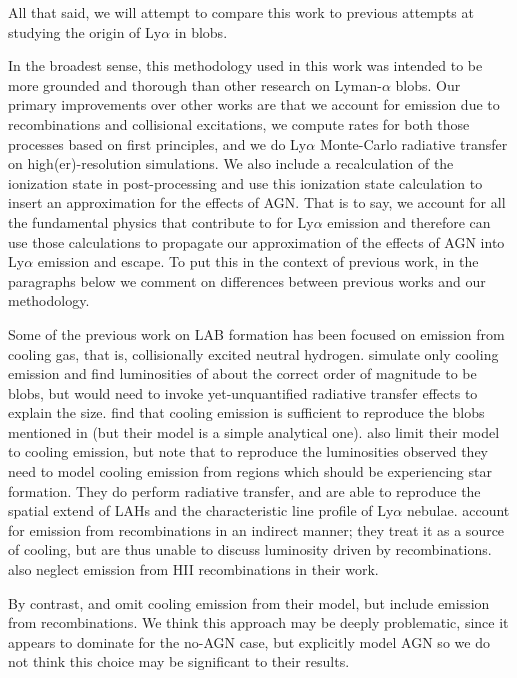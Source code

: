 All that said, we will attempt to compare this work to previous attempts at studying the origin of Ly$\alpha$ in blobs.

In the broadest sense, this methodology used in this work was intended to be more grounded and thorough than other research on Lyman-$\alpha$ blobs.
Our primary improvements over other works are that we account for emission due to recombinations and collisional excitations, we compute rates for both those processes based on first principles, and we do Ly$\alpha$ Monte-Carlo radiative transfer on high(er)-resolution simulations.
We also include a recalculation of the ionization state in post-processing and use this ionization state calculation to insert an approximation for the effects of AGN.
That is to say, we account for all the fundamental physics that contribute to for Ly$\alpha$ emission and therefore can use those calculations to propagate our approximation of the effects of AGN into Ly$\alpha$ emission and escape.
To put this in the context of previous work, in the paragraphs below we comment on differences between previous works and our methodology.

Some of the previous work on LAB formation has been focused on emission from cooling gas, that is, collisionally excited neutral hydrogen.
\citet{Fardal2001} simulate only cooling emission and find luminosities of about the correct order of magnitude to be blobs, but would need to invoke yet-unquantified radiative transfer effects to explain the size.
\citet{Haiman2000} find that cooling emission is sufficient to reproduce the blobs mentioned in \citet{Steidel2000} (but their model is a simple analytical one).
\citet{Faucher-Giguere2010} also limit their model to cooling emission, but note that to reproduce the luminosities observed they need to model cooling emission from regions which should be experiencing star formation.
They do perform radiative transfer, and are able to reproduce the spatial extend of LAHs and the characteristic line profile of Ly$\alpha$ nebulae.
\citet{Rosdahl2012} account for emission from recombinations in an indirect manner; they treat it as a source of cooling, but are thus unable to discuss luminosity driven by recombinations.
\citet{Goerdt2010} also neglect emission from HII recombinations in their work.

By contrast, \citet{Cantalupo2005} and \citet{Gronke2017} omit cooling emission from their model, but include emission from recombinations.
We think this approach may be deeply problematic, since it appears to dominate for the no-AGN case, but \citet{Gronke2017} explicitly model AGN so we do not think this choice may be significant to their results.

